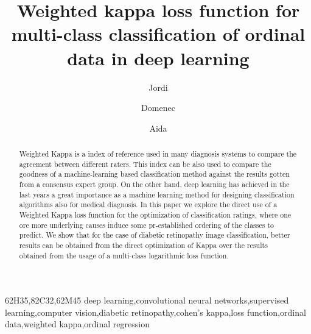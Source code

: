 \documentclass[times,twocolumn,final,authoryear]{elsarticle}
\begin{document}
\begin{frontmatter}

\title{Weighted kappa loss function for multi-class classification of ordinal data in deep learning}

\author[1]{Jordi } 
\author[1]{Domenec }
\author[1]{Aida }


\address[1]{Departament d'Enginyeria Inform\`{a}tica i Matem\`{a}tiques\\ Universitat Rovira i Virgili \\ Avinguda Pa\"{i}sos Catalans, 26 \\ ES-43007 Tarragona}



\begin{abstract}

Weighted Kappa is a index of reference used in many diagnosis systems to compare the agreement between different raters. This index can be also used to compare the goodness of a machine-learning based classification method against the results gotten from a consensus expert group. On the other hand, deep learning has achieved in the last years a great importance as a machine learning method for designing classification algorithms also for medical diagnosis. In this paper we explore the direct use of a Weighted Kappa loss function for the optimization of classification ratings, where one ore more underlying causes induce some pr-established ordering of the classes to predict. We show that for the case of diabetic retinopathy image classification, better results can be obtained from the direct optimization of Kappa over the results obtained from the usage of a multi-class logarithmic loss function.

\end{abstract}

\begin{keyword}
\MSC 62H35\sep 82C32\sep 62M45
\KWD deep learning\sep convolutional neural networks\sep supervised learning\sep computer vision\sep diabetic retinopathy\sep cohen's kappa\sep loss function\sep ordinal data\sep weighted kappa\sep ordinal regression

\end{keyword}

\end{frontmatter}
\end{document}
